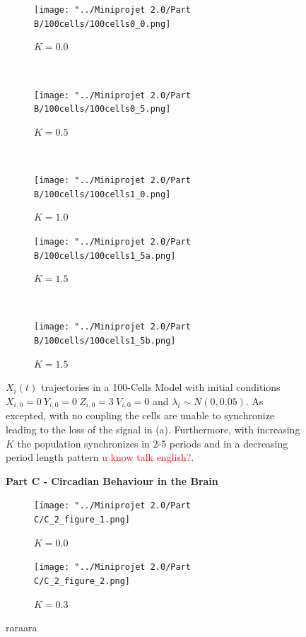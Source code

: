 \documentclass[10pt,a4paper,oneside,twocolumn]{article}
\newcommand{\red}[1]{\textcolor{red}{#1}}
\numberwithin{equation}{section} %
\begin{document}
    \begin{figure}
    \centering
	\begin{subfigure}[b]{0.45\textwidth}
	    \texttt{[image: "../Miniprojet 2.0/Part B/100cells/100cells0\_0.png]}
	    \caption{$K=0.0$}
	\end{subfigure}
	~ 
	\begin{subfigure}[b]{0.45\textwidth}
	    \texttt{[image: "../Miniprojet 2.0/Part B/100cells/100cells0\_5.png]}
	    \caption{$K=0.5$}
	\end{subfigure}
	~ 
	\begin{subfigure}[b]{0.45\textwidth}
	    \texttt{[image: "../Miniprojet 2.0/Part B/100cells/100cells1\_0.png]}
	    \caption{$K=1.0$}
	\end{subfigure}
	 
	\begin{subfigure}[b]{0.45\textwidth}
	    \texttt{[image: "../Miniprojet 2.0/Part B/100cells/100cells1\_5a.png]}
	    \caption{$K=1.5$}
	\end{subfigure}
	~ 
	\begin{subfigure}[b]{0.45\textwidth}
	    \texttt{[image: "../Miniprojet 2.0/Part B/100cells/100cells1\_5b.png]}
	    \caption{$K=1.5$}
	\end{subfigure}

	\caption{$X_i(t)$ trajectories in a 100-Cells Model with initial conditions $X_{i,0}=0~Y_{i,0}=0~Z_{i,0}=3~V_{i,0}=0$ and $\lambda_i \sim N(0, 0.05)$. As excepted, with no coupling the cells are unable to synchronize leading to the loss of the signal in (a). Furthermore, with increasing $K$ the population synchronizes in 2-5 periods and in a decreasing period length pattern \red{u know talk english?}.}
    \end{figure}


    \begin{figure}[!htb] 		%
	\captionsetup{labelformat=empty}
	\caption{\Huge{\textbf{Part C - Circadian Behaviour in the Brain}}}
    \end{figure}

    \begin{figure}
    \centering
	\begin{subfigure}[b]{\textwidth}
	    \texttt{[image: "../Miniprojet 2.0/Part C/C\_2\_figure\_1.png]}
	    \caption{$K=0.0$}
	\end{subfigure}
	 
	\begin{subfigure}[b]{\textwidth}
	    \texttt{[image: "../Miniprojet 2.0/Part C/C\_2\_figure\_2.png]}
	    \caption{$K=0.3$}
	\end{subfigure}
	\caption{raraara}
    \end{figure}
\end{document}

